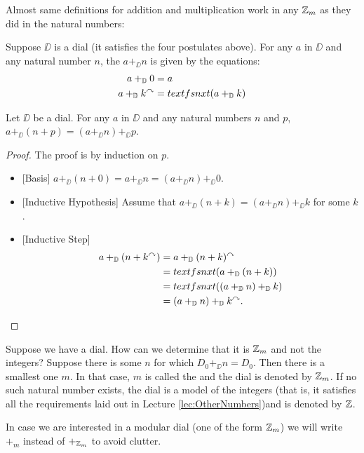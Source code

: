 Almost same definitions for addition and multiplication work in any ${\mathbb Z}_m$ as they did in the natural numbers:

\begin{defn}
	Suppose $\DD$ is a dial (it satisfies the four postulates above). For any $a$ in $\DD$ and any natural number $n$, the  $a+_\DD n$ is given by the equations:
	\begin{align*}
		a +_{\mathbb D} 0 &= a\\
		a +_{\mathbb D} k^\curvearrowright &= \mathord{textfs{nxt}}(a+_{\mathbb D} k)
	\end{align*}
\end{defn}

\begin{lem}
	Let $\DD$ be a dial.
	For any $a$ in $\DD$ and any natural numbers $n$ and $p$, $a +_\DD (n+p) = (a +_\DD n) +_\DD p$.
	
	\begin{proof}
		The proof is by induction on $p$. 
		\begin{itemize}
			\item{}[Basis] $a +_\DD (n+0) = a +_\DD n = (a +_\DD n) +_\DD 0$.
			\item{}[Inductive Hypothesis] Assume that $a +_\DD (n+k) = (a +_\DD n) +_\DD k$ for some $k$.
			\item{}[Inductive Step] 
			\begin{align*}
				a +_{\mathbb D} (n+k^\curvearrowright) &= a +_{\mathbb D} (n+k)^\curvearrowright\\ 
				                 &= \mathord{textfs{nxt}}(a +_{\mathbb D} (n+k))\\
				                 &= \mathord{textfs{nxt}}((a +_{\mathbb D} n) +_{\mathbb D} k)\\
				                 &= (a +_{\mathbb D} n) +_{\mathbb D} k^\curvearrowright.
			\end{align*}
		\end{itemize}
	\end{proof}
\end{lem}

Suppose we have a dial. How can we determine that it is ${\mathbb Z}_m$ and not the integers? Suppose there is some $n$ for which $D_0 +_\DD n = D_0$. Then there is a smallest one $m$. In that case, $m$ is called the  and the dial is denoted by ${\mathbb Z}_m$. If no such natural number exists, the dial is a model of the integers (that is, it satisfies all the requirements laid out in Lecture \ref{lec:OtherNumbers})and is denoted by ${\mathbb Z}$.

In case we are interested in a modular dial (one of the form ${\mathbb Z}_m$) we will write $+_m$ instead of $+_{{\mathbb Z}_m}$ to avoid clutter.

